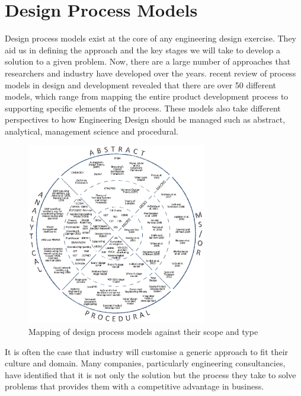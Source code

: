 \section{Design Process Models} 

Design process models exist at the core of any engineering design exercise. They aid us in defining the approach and the key stages we will take to develop a solution to a given problem. Now, there are a large number of approaches that researchers and industry have developed over the years. \citeauthor{wynn2017}\cite{wynn2017} recent review of process models in design and development revealed that there are over 50 different models, which range from mapping the entire product development process to supporting specific elements of the process. These models also take different perspectives to how Engineering Design should be managed such as abstract, analytical, management science and procedural. 

\begin{figure}[ht!]
  \centering
  \includegraphics[width=0.7\textwidth]{figs/wynn-review.png}
  \caption[Mapping of design process models against their scope and type]{Mapping of design process models against their scope and type~\citep{wynn2017}}
\end{figure}


It is often the case that industry will customise a generic approach to fit their culture and domain. Many companies, particularly engineering consultancies, have identified that it is not only the solution but the process they take to solve problems that provides them with a competitive advantage in business. 

